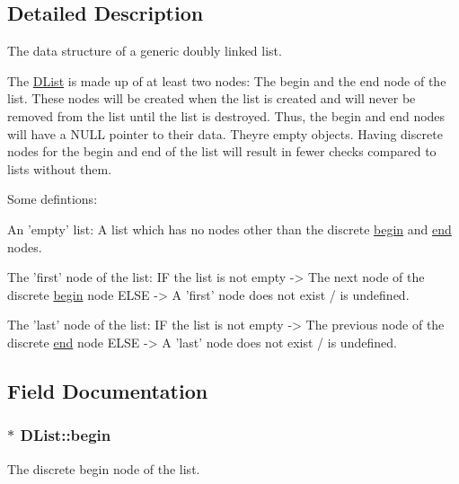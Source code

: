 \subsection{Detailed Description}
The data structure of a generic doubly linked list. 

The \hyperlink{structDList}{D\+List} is made up of at least two nodes\+: The begin and the end node of the list. These nodes will be created when the list is created and will never be removed from the list until the list is destroyed. Thus, the begin and end nodes will have a N\+U\+LL pointer to their data. They\textquotesingle{}re empty objects. Having discrete nodes for the begin and end of the list will result in fewer checks compared to lists without them.

Some defintions\+: 
\begin{DoxyCode}
An \textcolor{stringliteral}{'empty'} list:
    A list which has no nodes other than the discrete \hyperlink{structDList_a9f124f116c54de297ae53584cb3a13f6}{begin} and \hyperlink{structDList_ae11ba36cd0e3bdeac4c7189910993864}{end} nodes.

The \textcolor{stringliteral}{'first'} node of the list:
    IF the list is not empty    -> The next node of the discrete \hyperlink{structDList_a9f124f116c54de297ae53584cb3a13f6}{begin} node
    ELSE                        -> A \textcolor{stringliteral}{'first'} node does not exist / is undefined.

The \textcolor{stringliteral}{'last'} node of the list:
    IF the list is not empty    -> The previous node of the discrete \hyperlink{structDList_ae11ba36cd0e3bdeac4c7189910993864}{end} node
    ELSE                        -> A \textcolor{stringliteral}{'last'} node does not exist / is undefined.
\end{DoxyCode}
 

\subsection{Field Documentation}
\subsubsection[{\texorpdfstring{begin}{begin}}]{$\ast$ D\+List\+::begin}\hypertarget{structDList_a9f124f116c54de297ae53584cb3a13f6}{}\label{structDList_a9f124f116c54de297ae53584cb3a13f6}
The discrete begin node of the list. 
